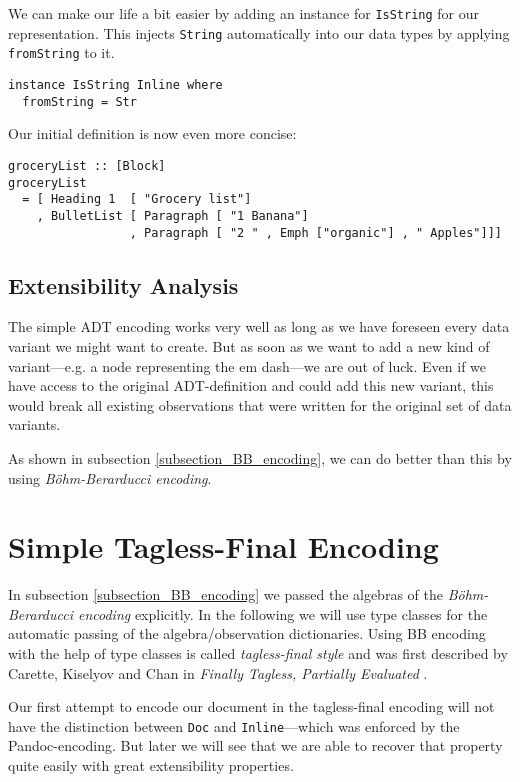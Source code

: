 We can make our life a bit easier by adding an instance for \texttt{IsString}
for our representation. This injects \texttt{String} automatically into our data
types by applying \texttt{fromString} to it.

\begin{lstlisting}
instance IsString Inline where
  fromString = Str
\end{lstlisting}


Our initial definition is now even more concise:

\begin{lstlisting}
groceryList :: [Block]
groceryList
  = [ Heading 1  [ "Grocery list"]
    , BulletList [ Paragraph [ "1 Banana"]
                 , Paragraph [ "2 " , Emph ["organic"] , " Apples"]]]
\end{lstlisting}



\subsection{Extensibility Analysis}

The simple ADT encoding works very well as long as we have foreseen every data
variant we might want to create. But as soon as we want to add a new kind of
variant—e.g. a node representing the em dash—we are out of luck. Even if we have
access to the original ADT-definition and could add this new variant, this would
break all existing observations that were written for the original set of
data variants.

As shown in subsection \ref{subsection_BB_encoding}, we can do better than this
by using \emph{Böhm-Berarducci encoding}.

\clearpage

\section{Simple Tagless-Final Encoding} \label{section_tagless-final}

In subsection \ref{subsection_BB_encoding} we passed the algebras of the
\emph{Böhm-Berarducci encoding} explicitly. In the following we will use type
classes for the automatic passing of the algebra/observation dictionaries. Using
BB encoding with the help of type classes is called \emph{tagless-final style}
and was first described by Carette, Kiselyov and Chan in \emph{Finally Tagless,
  Partially Evaluated} \cite{finally-tagless}.

Our first attempt to encode our document in the tagless-final encoding will not
have the distinction between \texttt{Doc} and \texttt{Inline}—which was enforced
by the Pandoc-encoding. But later we will see that we are able to recover that
property quite easily with great extensibility properties.

